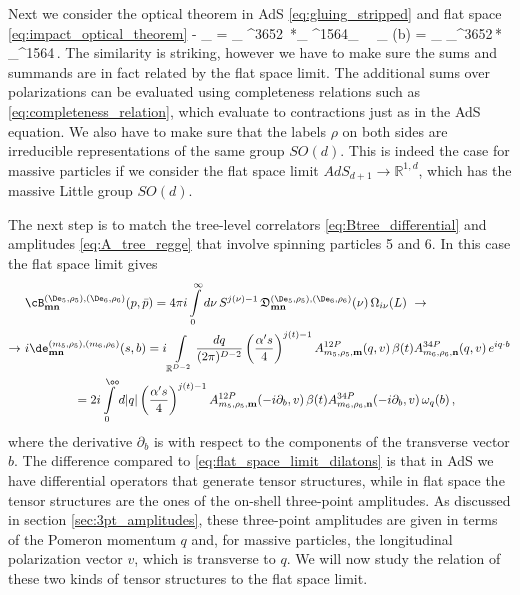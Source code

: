 Next we consider the optical theorem in AdS \eqref{eq:gluing_stripped} and flat space \eqref{eq:impact_optical_theorem}
\beq
- \Re \cB_{} = 
\sum\limits_{}
\cB^{3652\, *}_  \cB^{1564}_
\ \to \
\Im \de_{} (b)
=  \sum\limits_{}
\de_^{3652\,*} \de_\text{tree}^{1564}\,.
\eeq
The similarity is striking, however we have to make sure  the sums and summands are in fact related by the flat space limit.
The additional sums over polarizations can be evaluated using completeness relations such as
\eqref{eq:completeness_relation}, which evaluate to contractions just as in the AdS equation.
We also have to make sure that the labels $\rho$ on both sides are irreducible representations of the same group $SO(d)$. This is indeed the case for massive particles if we consider the flat space limit $AdS_{d+1} \to \mathbb{R}^{1,d}$, which has the massive Little group $SO(d)$.

The next step is to match the tree-level correlators \eqref{eq:Btree_differential} and amplitudes \eqref{eq:A_tree_regge} that involve spinning particles 5 and 6. In this case the flat space limit gives
\begin{align}
	      & \cB^{(\De_5,\rho_5),(\De_6,\rho_6)}_{\mathbf{m} \mathbf{n}}  (p,\bar{p})
	= 4 \pi i \int\limits_{0}^\infty d\nu \, S^{j(\nu)-1}
	\,\mathfrak{D}^{(\De_5,\rho_5),(\De_6,\rho_6)}_{\mathbf{m} \mathbf{n}} (\nu)
	\,\Omega_{i \nu} (L)\ \to
	\label{eq:flat_space_limit_spinning}
	\\
	\to\  &
	i \de^{(m_5,\rho_5),(m_6,\rho_6)}_{\mathbf{m} \mathbf{n}} (s,b)
	= i \int\limits_{\mathbb{R}^{D-2}} \frac{dq}{(2\pi)^{D-2}} \left(\frac{\alpha's}{4}\right)^{j(t)-1} A^{12P}_{m_5,\rho_5,\mathbf{m}} (q,v)\, \beta(t) A^{34P}_{m_6,\rho_6,\mathbf{n}}(q,v)\, e^{i q\cdot b}
	\nonumber                                                                                                                                                                                                                     \\
	      & \qquad \qquad = 2i \int\limits_0^{\oo} d|q| \left(\frac{\alpha's}{4}\right)^{j(t)-1} A^{12P}_{m_5,\rho_5,\mathbf{m}} (-i\partial_{b},v)\, \beta(t) A^{34P}_{m_6,\rho_6,\mathbf{n}}(-i\partial_{b},v)\, \omega_q(b)\,,
	\nonumber
\end{align}
where the derivative $\partial_{b}$ is with respect to the components of the transverse vector $b$.
The difference compared to \eqref{eq:flat_space_limit_dilatons} is that in AdS we  have differential operators that generate tensor structures, while  in flat space the tensor structures are the ones of the on-shell three-point amplitudes. As discussed in section \ref{sec:3pt_amplitudes}, these three-point amplitudes are given in terms of the Pomeron momentum $q$ and, for massive particles, the longitudinal polarization vector $v$, which is transverse to $q$.
We will now study the relation of these two kinds of tensor structures to the flat space limit.

